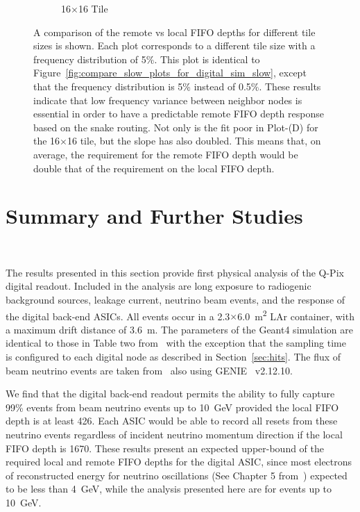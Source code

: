 \begin{figure}
\begin{subfigure}[b]{0.475\textwidth}
      \caption[]%
      {\small 16$\times$16 Tile}    
  \end{subfigure}
  \caption[]
  {\small A comparison of the remote vs local FIFO depths for different tile sizes is shown.
  Each plot corresponds to a different tile size with a frequency distribution of 5\%.
  This plot is identical to Figure~\ref{fig:compare_slow_plots_for_digital_sim_slow}, except that the frequency distribution is 5\% instead of 0.5\%.
  These results indicate that low frequency variance between neighbor nodes is essential in order to have a predictable remote FIFO depth response based on the snake routing.
  Not only is the fit poor in Plot-(D) for the 16$\times$16 tile, but the slope has also doubled.
  This means that, on average, the requirement for the remote FIFO depth would be double that of the requirement on the local FIFO depth.
} 
  \label{fig:compare_fast_plots_for_digital_sim_fast}
\end{figure}







\section{Summary and Further Studies}~\label{sec:further_studies}

The results presented in this section provide first physical analysis of the Q-Pix digital readout.
Included in the analysis are long exposure to radiogenic background sources, leakage current, neutrino beam events, and the response of the digital back-end ASICs.
All events occur in a 2.3$\times$6.0~\unit{m^{2}} LAr container, with a maximum drift distance of 3.6~\unit{m}.
The parameters of the Geant4 simulation are identical to those in Table two from~\citep{qpix:shion} with the exception that the sampling time is configured to each digital node as described in Section~\ref{sec:hits}.
The flux of beam neutrino events are taken from~\citep{dune_2021_near_detector_cdr} also using GENIE~\citep{Andreopoulos:2009rq} v2.12.10.

We find that the digital back-end readout permits the ability to fully capture 99\% events from beam neutrino events up to 10~\unit{GeV} provided the local FIFO depth is at least 426.
Each ASIC would be able to record all resets from these neutrino events regardless of incident neutrino momentum direction if the local FIFO depth is 1670.
These results present an expected upper-bound of the required local and remote FIFO depths for the digital ASIC, since most electrons of reconstructed energy for neutrino oscillations (See Chapter 5 from~\citep{DUNE_TDRv3_Abi_2020}) expected to be less than 4~\unit{GeV}, while the analysis presented here are for events up to 10~\unit{GeV}.

